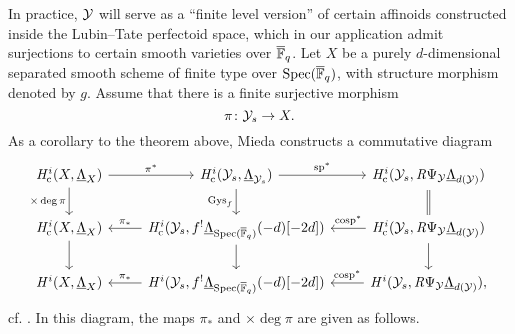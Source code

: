 \documentclass[../main.tex]{subfiles}
\begin{document}
In practice, $\mathcal{Y}$ will serve as a “finite level version”
of certain affinoids constructed inside the Lubin--Tate
perfectoid space, which in our application admit surjections
to certain smooth varieties over ${\overline {\mathbb{F}}_q}$. Let $X$ be a purely $d$-dimensional separated smooth scheme of finite type
over $\operatorname{Spec}({\overline {\mathbb{F}}_q})$, with structure morphism denoted by $g$. Assume that there is a finite surjective morphism
\begin{equation*}
  \pi\colon \mathcal{Y}_s \to X.
\end{equation*}
As a corollary to the theorem above, Mieda constructs a commutative diagram
\begin{equation}\label{eq:MiedasCommutingDiagram}
\begin{tikzcd}[ampersand replacement=\&]
  {\hHc^i(X, \underline \Lambda_X)} \& {\hHc^i(\cY_s, \underline
  \Lambda_{\cY_s})} \& {\hHc^i(\cY_s, \derR \Psi_\cY \underline
    \Lambda_{d(\cY)})} \\
  {\hHc^i(X, \underline \Lambda_{X})} \& {\hHc^i(\cY_s, f^! \underline
  \Lambda_{\spec(\Fqbar)}(-d)[-2d])} \& {\hHc^i(\cY_s, \derR \Psi_\cY
  \underline \Lambda_{d(\cY)})} \\
  {\hH^i(X, \underline \Lambda_{X})} \& {\hH^i(\cY_s, f^! \underline
  \Lambda_{\spec(\Fqbar)}(-d)[-2d])} \& {\hH^i(\cY_s, \derR \Psi_\cY \underline
  \Lambda_{d(\cY)}),}
	\arrow["{\pi^*}", from=1-1, to=1-2]
	\arrow["{\times \deg\pi}"', from=1-1, to=2-1]
	\arrow["{\specmap^*}", from=1-2, to=1-3]
	\arrow["{\Gys_f}"', from=1-2, to=2-2]
	\arrow[Rightarrow, no head, from=1-3, to=2-3]
	\arrow[from=2-1, to=3-1]
	\arrow["{\pi_*}"', from=2-2, to=2-1]
	\arrow[from=2-2, to=3-2]
	\arrow["{\cospecmap^*}"', from=2-3, to=2-2]
	\arrow[from=2-3, to=3-3]
	\arrow["{\pi_*}"', from=3-2, to=3-1]
	\arrow["{\cospecmap^*}"', from=3-3, to=3-2]
\end{tikzcd}
\end{equation}
cf. \cite[Corollary 2.7]{mieda2016geometric}.
In this diagram, the maps $\pi_*$ and $\times \deg \pi$ are given as follows.
\end{document}
